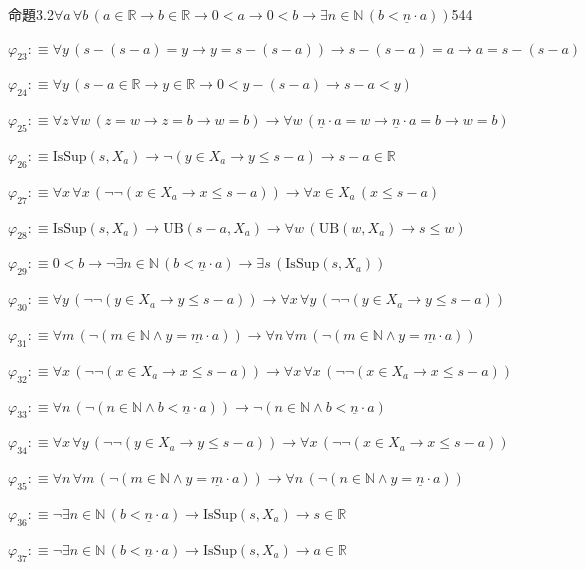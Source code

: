 \begin{fullproof}{命題3.2}{$\forall a\,\forall b\,(a \in \mathbb{R} \to b \in \mathbb{R} \to 0 < a \to 0 < b \to \exists n \in \mathbb{N}\,(b < \underline{n} \cdot a))$}{544}
\begin{abbrevlist}
\item $\varphi_{23} :\equiv \forall y\,(s - (s - a) = y \to y = s - (s - a)) \to s - (s - a) = a \to a = s - (s - a)$
\item $\varphi_{24} :\equiv \forall y\,(s - a \in \mathbb{R} \to y \in \mathbb{R} \to 0 < y - (s - a) \to s - a < y)$
\item $\varphi_{25} :\equiv \forall z\,\forall w\,(z = w \to z = b \to w = b) \to \forall w\,(\underline{n} \cdot a = w \to \underline{n} \cdot a = b \to w = b)$
\item $\varphi_{26} :\equiv \mathrm{IsSup}(s,X_{a}) \to \neg (y \in X_{a} \to y \leq s - a) \to s - a \in \mathbb{R}$
\item $\varphi_{27} :\equiv \forall x\,\forall x\,(\neg \neg (x \in X_{a} \to x \leq s - a)) \to \forall x \in X_{a}\,(x \leq s - a)$
\item $\varphi_{28} :\equiv \mathrm{IsSup}(s,X_{a}) \to \mathrm{UB}(s - a,X_{a}) \to \forall w\,(\mathrm{UB}(w,X_{a}) \to s \leq w)$
\item $\varphi_{29} :\equiv 0 < b \to \neg \exists n \in \mathbb{N}\,(b < \underline{n} \cdot a) \to \exists s\,(\mathrm{IsSup}(s,X_{a}))$
\item $\varphi_{30} :\equiv \forall y\,(\neg \neg (y \in X_{a} \to y \leq s - a)) \to \forall x\,\forall y\,(\neg \neg (y \in X_{a} \to y \leq s - a))$
\item $\varphi_{31} :\equiv \forall m\,(\neg (m \in \mathbb{N} \land y = \underline{m} \cdot a)) \to \forall n\,\forall m\,(\neg (m \in \mathbb{N} \land y = \underline{m} \cdot a))$
\item $\varphi_{32} :\equiv \forall x\,(\neg \neg (x \in X_{a} \to x \leq s - a)) \to \forall x\,\forall x\,(\neg \neg (x \in X_{a} \to x \leq s - a))$
\item $\varphi_{33} :\equiv \forall n\,(\neg (n \in \mathbb{N} \land b < \underline{n} \cdot a)) \to \neg (n \in \mathbb{N} \land b < \underline{n} \cdot a)$
\item $\varphi_{34} :\equiv \forall x\,\forall y\,(\neg \neg (y \in X_{a} \to y \leq s - a)) \to \forall x\,(\neg \neg (x \in X_{a} \to x \leq s - a))$
\item $\varphi_{35} :\equiv \forall n\,\forall m\,(\neg (m \in \mathbb{N} \land y = \underline{m} \cdot a)) \to \forall n\,(\neg (n \in \mathbb{N} \land y = \underline{n} \cdot a))$
\item $\varphi_{36} :\equiv \neg \exists n \in \mathbb{N}\,(b < \underline{n} \cdot a) \to \mathrm{IsSup}(s,X_{a}) \to s \in \mathbb{R}$
\item $\varphi_{37} :\equiv \neg \exists n \in \mathbb{N}\,(b < \underline{n} \cdot a) \to \mathrm{IsSup}(s,X_{a}) \to a \in \mathbb{R}$

\end{abbrevlist}
\end{fullproof}
